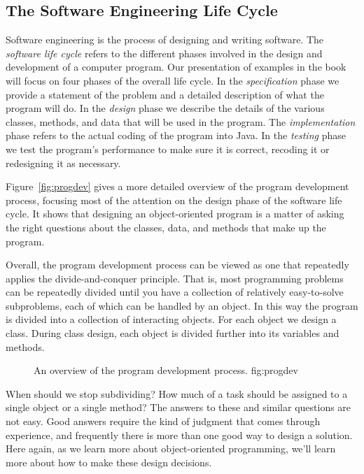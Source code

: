 \subsection{The Software Engineering Life Cycle}

\noindent Software engineering is the process of designing
and writing software.  The {\it software life cycle} refers to the
different phases involved in the design and development of a computer
program.  Our presentation of examples in the book will focus on four
phases of the overall life cycle. In the {\em specification} phase we
provide a statement of the problem and a detailed description of what
the program will do. In the {\em design} phase we describe the details
of the various classes, methods, and data that will be used in the
program. The {\em implementation} phase refers to the actual coding of
the program into Java.  In the {\em testing} phase we test the
program's performance to make sure it is correct, recoding it or
redesigning it as necessary.

Figure~\ref{fig:progdev} gives a more detailed overview of the program
development process, focusing most of the attention on the design
phase of the software life cycle. It shows that designing an
object-oriented program is a matter of asking the right questions
about the classes, data, and methods that make up the program. 

Overall, the program development process can be viewed as one that
repeatedly applies the divide-and-conquer principle.  That is, most
programming problems can be repeatedly divided until you have a
collection of relatively easy-to-solve subproblems, each of which can
be handled by an object. In this way the program is
divided into a collection of interacting objects. For each object we
design a class. During class design, each object is divided further
into its variables and methods.

\begin{figure}[h]
%
{An overview of the program development process.}
{fig:progdev}
\end{figure}

When should we stop subdividing? How much of a task should be assigned
to a single object or a single method?  The answers to these and
similar questions are not easy.  Good answers require the kind of 
judgment that comes through experience, and frequently there is more
than one good way to design a solution.  Here again, as we learn more
about object-oriented programming, we'll learn more about how to make
these design decisions.

